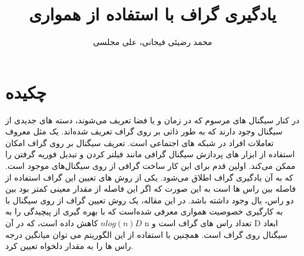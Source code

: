 \documentclass[10pt,twocolumn,a4paper]{article}
\title{یادگیری گراف با استفاده از همواری}
\author{
	محمد رضیئی فیجانی،
	علی مجلسی
}
\date{}
\begin{document}
	
	
	\maketitle
	
	\section*{چکیده}
	\begin{strip}
		در کنار سیگنال های مرسوم که در زمان و یا فضا تعریف می‌شوند، دسته های جدیدی از سیگنال وجود دارند که به طور ذاتی بر روی گراف تعریف شده‌اند. یک مثل معروف تعاملات افراد در شبکه های اجتماعی است. تعریف سیگنال بر روی گراف امکان استفاده از ابزار های پردازش سیگنال گرافی مانند فیلتر کردن و تبدیل فوریه گرفتن را ممکن می‌کند. اولین قدم برای این کار ساخت گرافی از روی سیگنال‌های موجود است. که به آن یادگیری گراف اطلاق می‌شود. یکی از روش های تعیین این گراف استفاده از فاصله بین راس ها است به این صورت که اگر این فاصله از مقدار معینی کمتر بود بین دو راس، یال وجود داشته باشد. در این مقاله، یک روش تعیین گراف از روی سیگنال با به کارگیری خصوصیت همواری معرفی شده‌است که با بهره گیری از 
		پیچیدگی را به
		$nlog(n)D$
		کاهش داده است، که در آن n تعداد راس های گراف است و D ابعاد سیگنال روی گراف است. همچنین با استفاده از این الگوریتم می توان میانگین درجه راس ها را به مقدار دلخواه تعیین کرد.
	\end{strip}
	
\end{document}
